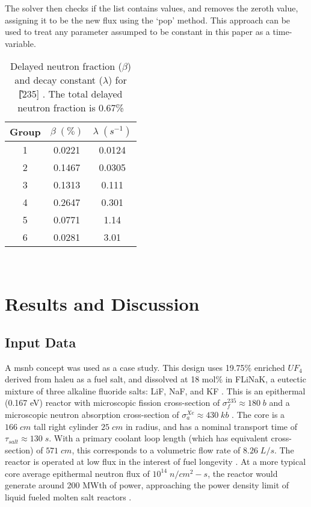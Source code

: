 The solver then checks if the list contains values, and removes the zeroth value, assigning it to be the new flux using the `pop' method. This approach can be used to treat any parameter assumped to be constant in this paper as a time-variable.

\begin{table}[ht!]
    \caption[Delayed neutron data]{Delayed neutron fraction ($\beta$) and decay constant ($\lambda$) for \U[235] \cite{Kerlin}. The total delayed neutron fraction is 0.67\%}
    \centering\begin{tabular}{c|cc}
    Group  & $\beta \;(\%)$   & $\lambda \; (s^{-1})$ \\ \hline
        1  & 0.0221           & 0.0124 \\ 
        2  & 0.1467           & 0.0305 \\
        3  & 0.1313           & 0.111  \\ 
        4  & 0.2647           & 0.301  \\ 
        5  & 0.0771           & 1.14   \\ 
        6  & 0.0281           & 3.01   \\               
    \end{tabular}\\
    \label{tab:precursors}
\end{table}


\section{Results and Discussion} \label{sec-res}

\subsection{Input Data}
A \acs{msnb} concept was used as a case study. This design uses 19.75\% enriched $UF_4$ derived from \acf{haleu} as a fuel salt, and dissolved at 18 mol\% in FLiNaK, a eutectic mixture of three alkaline fluoride salts: LiF, NaF, and KF \cite{CarterNumerical}. This is an epithermal (0.167 eV) reactor with microscopic fission cross-section of $\sigma_{f}^{235}\approx 180\; b$ and a microscopic \Xe neutron absorption cross-section of $\sigma_{a}^{Xe}\approx 430\; kb$ \cite{TENDL}. The core is a $166\; cm$ tall right cylinder $25\; cm$ in radius, and has a nominal transport time of $\tau_{salt} \approx 130\; s$. With a primary coolant loop length (which has equivalent cross-section) of $571\; cm$, this corresponds to a volumetric flow rate of $8.26 \; L/s$. The reactor is operated at low flux in the interest of fuel longevity \cite{CarterNumerical}.  At a more typical core average epithermal neutron flux of $10^{14} \; n/cm^{2}-s$, the reactor would generate around 200 MWth of power, approaching the power density limit of liquid fueled molten salt reactors \cite{PowerDensity}. 

